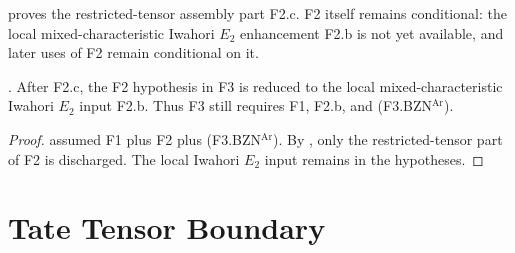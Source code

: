\begin{remark}
\label{v4-arith:tate:rem:F2-form-final}
 proves the restricted-tensor
assembly part F2.c. F2 itself remains conditional: the local
mixed-characteristic Iwahori \(E_{2}\) enhancement F2.b is not yet
available, and later uses of F2 remain conditional on it.
\end{remark}

\begin{corollary}
\label{v4-arith:tate:cor:F3-reduces-with-F2-closed}
\ClaimStatusNeedsVerification. After F2.c, the F2 hypothesis in
F3 is reduced to the local mixed-characteristic Iwahori \(E_{2}\)
input F2.b. Thus F3 still requires F1, F2.b, and
(F3.BZN\(^{\mathrm{Ar}}\)).
\end{corollary}

\begin{proof}
 assumed F1 plus F2 plus
(F3.BZN\(^{\mathrm{Ar}}\)). By
, only the restricted-tensor
part of F2 is discharged. The local Iwahori \(E_{2}\) input remains
in the hypotheses.
\end{proof}

\section{Tate Tensor Boundary}
\label{v4-arith:tate:summary}

